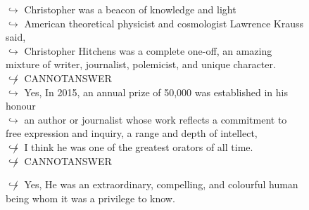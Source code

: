 \documentclass[11pt,a4paper, onecolumn]{article}
\begin{document}
\begin{figure}[t] \small \begin{tcolorbox}[boxsep=0pt,left=5pt,right=0pt,top=2pt,colback = yellow!5] \begin{dialogue}
 \small 
\colorbox{pink!25}{$\hookrightarrow$}
{ Christopher was a beacon of knowledge and light }
\\
\colorbox{pink!25}{$\hookrightarrow$}
{ American theoretical physicist and cosmologist Lawrence Krauss said, }
\\
\colorbox{pink!25}{$\hookrightarrow$}
{ Christopher Hitchens was a complete one-off, an amazing mixture of writer, journalist, polemicist, and unique character. }
\\
\colorbox{pink!25}{$\not\hookrightarrow$}
{ CANNOTANSWER }
\\
\colorbox{pink!25}{$\hookrightarrow$}
\colorbox{red!25}{Yes,}
{ In 2015, an annual prize of  50,000 was established in his honour }
\\
\colorbox{pink!25}{$\hookrightarrow$}
{ an author or journalist whose work reflects a commitment to free expression and inquiry, a range and depth of intellect, }
\\
\colorbox{pink!25}{$\not\hookrightarrow$}
{ I think he was one of the greatest orators of all time. }
\\
\colorbox{pink!25}{$\not\hookrightarrow$}
{ CANNOTANSWER }
 \end{dialogue}\end{tcolorbox}\end{figure}\begin{figure}[t] \small \begin{tcolorbox}[boxsep=0pt,left=5pt,right=0pt,top=2pt,colback = yellow!5] \begin{dialogue}
 \small 
\colorbox{pink!25}{$\not\hookrightarrow$}
\colorbox{red!25}{Yes,}
{ He was an extraordinary, compelling, and colourful human being whom it was a privilege to know. }
\\
 \end{dialogue}\end{tcolorbox}\end{figure}
\end{document}
